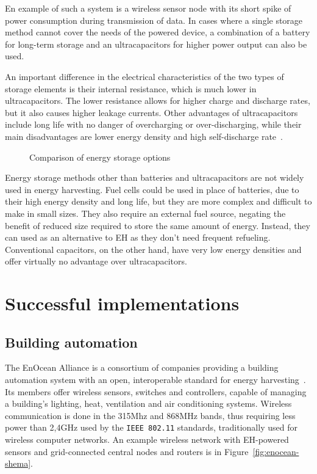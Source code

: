 \documentclass[a4paper,10pt]{article}
\begin{document}
En example of such a system is a wireless sensor node with its short spike of power consumption during transmission of data. In cases where a single storage method cannot cover the needs of the powered device, a combination of a battery for long-term storage and an ultracapacitors for higher power output can also be used. 

An important difference in the electrical characteristics of the two types of storage elements is their internal resistance, which is much lower in ultracapacitors. The lower resistance allows for higher charge and discharge rates, but it also causes higher leakage currents. Other advantages of ultracapacitors include long life with no danger of overcharging or over-discharging, while their main disadvantages are lower energy density and high self-discharge rate~\cite{wiki:edlc}. 

\begin{figure}[!h]
\centering
\def\svgwidth{0.8\textwidth}
 
\caption{Comparison of energy storage options~\cite{wiki:edlc}}
\label{fig:storage-chart}
\end{figure}

Energy storage methods other than batteries and ultracapacitors are not widely used in energy harvesting. Fuel cells could be used in place of batteries, due to their high energy density and long life, but they are more complex and difficult to make in small sizes. They also require an external fuel source, negating the benefit of reduced size required to store the same amount of energy. Instead, they can used as an alternative to \ac{EH} as they don't need frequent refueling. Conventional capacitors, on the other hand, have very low energy densities and offer virtually no advantage over ultracapacitors. 

\section{Successful implementations}

\subsection{Building automation}

The EnOcean Alliance is a consortium of companies providing a building automation system with an open, interoperable standard for energy harvesting~\cite{enocean}. Its members offer wireless sensors, switches and controllers, capable of managing a building's lighting, heat, ventilation and air conditioning systems. Wireless communication is done in the 315Mhz and 868MHz bands, thus requiring less power than 2,4GHz used by the \texttt{IEEE 802.11} standards, traditionally used for wireless computer networks. An example wireless network with \ac{EH}-powered sensors and grid-connected central nodes and routers is in Figure~\ref{fig:enocean-shema}. 
\end{document}
